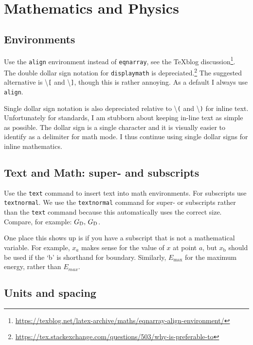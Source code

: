 \section{Mathematics and Physics}

\subsection{Environments}

Use the \texttt{align} environment instead of \texttt{eqnarray}, see the TeXblog discussion\footnote{\url{https://texblog.net/latex-archive/maths/eqnarray-align-environment/}}. The double dollar sign notation for \texttt{displaymath} is depreciated.\footnote{\url{https://tex.stackexchange.com/questions/503/why-is-preferable-to}} The suggested alternative is \textbackslash\texttt{[} and \textbackslash\texttt{]}, though this is rather annoying. As a default I always use \texttt{align}.

Single dollar sign notation is also depreciated relative to \textbackslash\texttt{(} and \textbackslash\texttt{)} for inline text. Unfortunately for standards, I am stubborn about keeping in-line text as simple as possible. The dollar sign is a single character and it is visually easier to identify as a delimiter for math mode. I thus continue using single dollar signs for inline mathematics. 


\subsection{Text and Math: super- and subscripts}

Use the \texttt{text} command to insert text into math environments. For subscripts use \texttt{textnormal}. 
% 
We use the \texttt{textnormal} command for super- or subscripts rather than the \texttt{text} command because this automatically uses the correct size. Compare, for example: $G_\textnormal{D},\, G_\text{D}$.

One place this shows up is if you have a subscript that is not a mathematical variable. For example, $x_a$ makes sense for the value of $x$ at point $a$, but $x_\text{b}$ should be used if the `b' is shorthand for boundary. Similarly, $E_\text{max}$ for the maximum energy, rather than $E_{max}$.


\subsection{Units and spacing}

